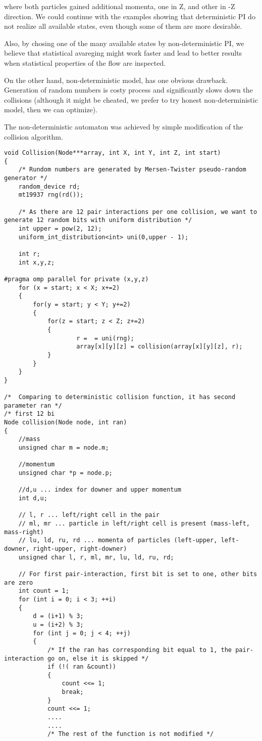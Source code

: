 where both particles gained additional momenta, one in Z, and other in -Z direction.
We could continue with the examples showing that deterministic PI do not realize all available states, even though some of them are more desirable. 

Also, by chosing one of the many available states by non-deterministic PI, we believe that statistical avareging might work faster and lead to better results when statistical properties of the flow are inspected.

\bigskip

On the other hand, non-deterministic model, has one obvious drawback. Generation of random numbers is costy process and significantly slows down the collisions (although it might be cheated, we prefer to try honest non-deterministic model, then we can optimize).

The non-deterministic automaton was achieved by simple modification of the collision algorithm.

\begin{lstlisting}
void Collision(Node***array, int X, int Y, int Z, int start)
{
	/* Rundom numbers are generated by Mersen-Twister pseudo-random generator */
	random_device rd;
	mt19937 rng(rd());
	
	/* As there are 12 pair interactions per one collision, we want to generate 12 random bits with uniform distribution */
	int upper = pow(2, 12);
	uniform_int_distribution<int> uni(0,upper - 1);
	
	int r;
	int x,y,z;

#pragma omp parallel for private (x,y,z)
	for (x = start; x < X; x+=2)
	{
		for(y = start; y < Y; y+=2)
		{
			for(z = start; z < Z; z+=2)
			{
					r =  = uni(rng);
					array[x][y][z] = collision(array[x][y][z], r);
			}
		}
	}
}

/*  Comparing to deterministic collision function, it has second parameter ran */
/* first 12 bi
Node collision(Node node, int ran)
{
	//mass
	unsigned char m = node.m;
	
	//momentum
    unsigned char *p = node.p;

	//d,u ... index for downer and upper momentum
	int d,u;
    
	// l, r ... left/right cell in the pair
	// ml, mr ... particle in left/right cell is present (mass-left, mass-right)
	// lu, ld, ru, rd ... momenta of particles (left-upper, left-downer, right-upper, right-downer)
	unsigned char l, r, ml, mr, lu, ld, ru, rd;

	// For first pair-interaction, first bit is set to one, other bits are zero
	int count = 1;
	for (int i = 0; i < 3; ++i)
	{
		d = (i+1) % 3;
		u = (i+2) % 3;
		for (int j = 0; j < 4; ++j)
		{
			/* If the ran has corresponding bit equal to 1, the pair-interaction go on, else it is skipped */
			if (!( ran &count))
			{
				count <<= 1;
				break;
			}
			count <<= 1;
			....
			....
			/* The rest of the function is not modified */
\end{lstlisting}

